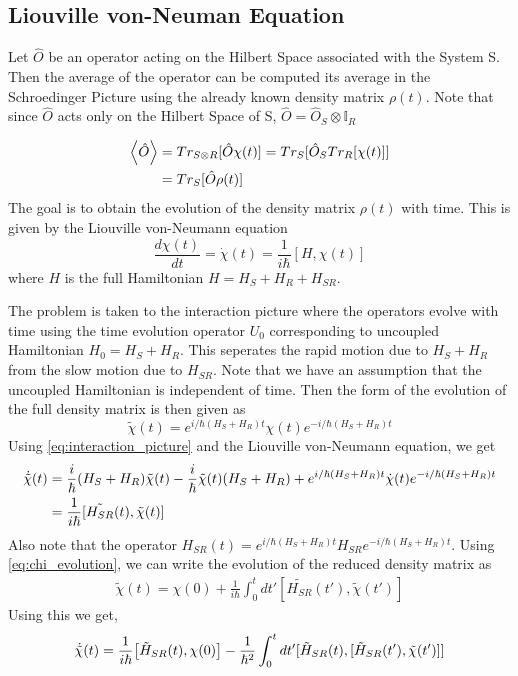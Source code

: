 \documentclass{scrartcl}
\newcommand{\1}{\mathbbm{1}}
\begin{document}
\subsection{Liouville von-Neuman Equation}
Let $\hat{O}$ be an operator acting on the Hilbert Space associated with the System S. Then the average of 
the operator can be computed its average in the Schroedinger Picture using the already known density matrix 
$\rho(t)$. Note that since $\hat{O}$ acts only on the Hilbert Space of S, $\hat{O} = \hat{O}_S \otimes 
\mathbb{I}_R$

\begin{align}
    \expval{\hat{O}} &= Tr_{S \otimes R}[\hat{O} \chi (t)] = Tr_S[\hat{O}_S Tr_R[\chi (t)]] \\ \nonumber
    &= Tr_S[\hat{O} \rho (t)] 
\end{align}
The goal is to obtain the evolution of the density matrix $\rho(t)$ with time. This is given by the Liouville von-Neumann equation
\begin{equation}
    \frac{d\chi (t)}{dt} = \dot{\chi}(t)= \frac{1}{i \hbar}[H, \chi (t)] 
\end{equation}
where $H$ is the full Hamiltonian $H = H_S + H_R + H_{SR}$.  

The problem is taken to the interaction picture where the operators evolve with time 
using the time evolution operator $U_0$ corresponding to uncoupled Hamiltonian $H_0 = H_S + H_R$. This seperates the
rapid motion due to $H_S+ H_R$ from the slow motion due to $H_{SR}$. Note that we have an assumption that the uncoupled
Hamiltonian is independent of time. Then the form of the evolution of the full density matrix is then given as 
\begin{equation}
    \tilde{\chi}(t) = e^{i\slash \hbar (H_S + H_R)t} \chi (t) e^{-i\slash \hbar (H_S + H_R)t}\label{eq:interaction_picture}
\end{equation}
Using \cref{eq:interaction_picture} and the Liouville von-Neumann equation, we get
\begin{align}
    \dot{\tilde{\chi}}(t) &= \frac{i}{\hbar}\qty(H_S + H_R )\tilde{\chi}(t) - \frac{i}{\hbar} \tilde{\chi}(t) \qty(H_S + H_R) + e^{i\slash \hbar (H_S + H_R)t} \dot{\chi} (t) e^{-i\slash \hbar (H_S + H_R)t} \\ \nonumber
    &= \frac{1}{i\hbar} [\tilde{H_{SR}}(t), \tilde{\chi}(t)] \label{eq:chi_evolution}
\end{align}
Also note that the operator $H_{SR}(t) = e^{i\slash \hbar (H_S + H_R)t} H_{SR} e^{-i\slash \hbar (H_S + H_R)t}$.
Using \cref{eq:chi_evolution}, we can write the evolution of the reduced density matrix as
\begin{align*}
    \tilde{\chi}(t) = \chi (0) + \frac{1}{i \hbar} \int_0^t dt' [\tilde{H_{SR}}(t'), \tilde{\chi}(t')]
\end{align*}
Using this we get,
\begin{align}
    \dot{\tilde{\chi}}(t) = \frac{1}{i \hbar} \qty[\tilde{H}_{SR}(t), \chi (0)] - \frac{1}{\hbar^2} \int_0^t dt' [\tilde{H}_{SR}(t), [\tilde{H}_{SR}(t'), \tilde{\chi}(t')]]
\end{align}
\end{document}
